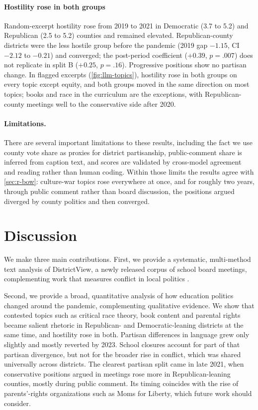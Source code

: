 \documentclass[12pt]{article}
\begin{document}
\paragraph{Hostility rose in both groups}
Random-excerpt hostility rose from 2019 to 2021 in Democratic (3.7 to 5.2) and Republican (2.5 to 5.2) counties and remained elevated. Republican-county districts were the less hostile group before the pandemic (2019 gap $-1.15$, CI $-2.12$ to $-0.21$) and converged; the post-period coefficient ($+0.39$, $p=.007$) does not replicate in split B ($+0.25$, $p=.16$). Progressive positions show no partisan change. In flagged excerpts (\cref{fig:llm-topics}), hostility rose in both groups on every topic except equity, and both groups moved in the same direction on most topics; books and race in the curriculum are the exceptions, with Republican-county meetings well to the conservative side after 2020.

\paragraph{Limitations.}
There are several important limitations to these results, including the fact we use county vote share as proxies for district partisanship, public-comment share is inferred from caption text, and scores are validated by cross-model agreement and reading rather than human coding. Within those limits the results agree with \cref{sec:r-bow}: culture-war topics rose everywhere at once, and for roughly two years, through public comment rather than board discussion, the positions argued diverged by county politics and then converged. 

\section{Discussion}\label{sec:discussion}

We make three main contributions. First, we provide a systematic, multi-method
text analysis of DistrictView, a newly released corpus of school board meetings,
complementing work that measures conflict in local politics
\citep{holman_et_al_2026}. 

Second, we provide a broad, quantitative analysis of how education politics changed
around the pandemic, complementing qualitative evidence. We show that contested topics such as critical race theory, book content
and parental rights became salient rhetoric in Republican- and Democratic-leaning districts
at the same time, and hostility rose in both. Partisan differences in language
grew only slightly and mostly reverted by 2023. School closures account for part
of that partisan divergence, but not for the broader rise in conflict, which was
shared universally across districts. The clearest partisan split came in late 2021, when
conservative positions argued in meetings rose more in Republican-leaning
counties, mostly during public comment.  Its timing coincides with the rise of
parents'-rights organizations such as Moms for Liberty, which future work should consider. 
\end{document}
